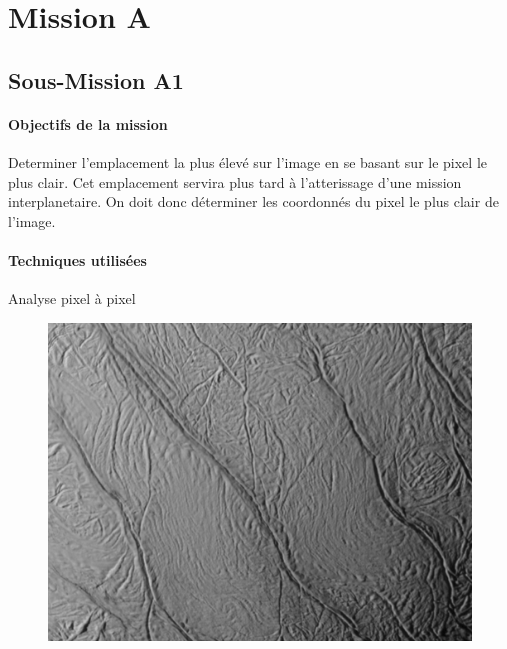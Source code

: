 \section{Mission A}
\subsection{Sous-Mission A1}

	\begin{vwcol}[widths={0.65,0.2}, rule=0pt]
		\begin{minipage}{0.7\textwidth}
			\paragraph{Objectifs de la mission}

			Determiner l'emplacement la plus élevé sur l'image en se basant sur le pixel le plus clair. Cet emplacement servira plus tard à l'atterissage d'une mission interplanetaire. On doit donc déterminer les coordonnés du pixel le plus clair de l'image.
		\end{minipage}

		\begin{minipage}{0.3\textwidth}
			\begin{flushright}
				\paragraph{Techniques utilisées}
			
				Analyse pixel à pixel
			\end{flushright}
		\end{minipage}
	\end{vwcol} 

	\begin{figure}[h]
		\centering
		\includegraphics[scale=0.6]{images/Encelade_surface.png}
	\end{figure}
	\vspace{-0.3cm}

